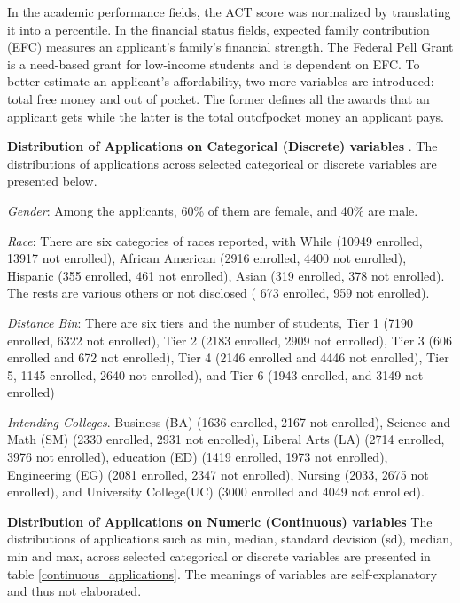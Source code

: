 \documentclass[12pt,english]{report}
\begin{document}
In the academic performance fields, the ACT score was normalized by translating it into a percentile.
In the financial status fields, expected family contribution (EFC) measures an applicant's family's financial strength. The Federal Pell Grant is a need-based grant for low-income students and is dependent on EFC. To better estimate an applicant's affordability, two more variables are introduced: total free money and out of pocket. The former defines all the awards that an applicant gets while the latter is the total out\-of\-pocket money an applicant pays.


\vspace{0.15in}
\noindent \textbf{Distribution of Applications on Categorical (Discrete) variables }.  The distributions of applications across selected categorical or discrete variables are presented below. 

\noindent \textit{Gender}: Among the applicants, 60\% of them are female, and 40\% are male.  

\noindent \textit{Race}:  There are six categories of races reported, with While (10949 enrolled, 13917 not enrolled), African American (2916 enrolled, 4400 not enrolled), Hispanic (355 enrolled, 461 not enrolled), Asian (319 enrolled, 378 not enrolled).  The rests are various others or not disclosed ( 673 enrolled, 959 not enrolled).

\noindent \textit{Distance Bin}: There are six tiers and the number of students, Tier 1 (7190 enrolled, 6322 not enrolled), Tier 2 (2183 enrolled, 2909 not enrolled), Tier 3 (606 enrolled and 672 not enrolled), Tier 4 (2146 enrolled and 4446 not enrolled), Tier 5, 1145 enrolled, 2640 not enrolled), and Tier 6 (1943 enrolled, and 3149 not enrolled) 

\noindent \textit{Intending Colleges}.  Business (BA) (1636 enrolled, 2167 not enrolled), Science and Math (SM) (2330 enrolled, 2931 not enrolled), Liberal Arts (LA) (2714 enrolled, 3976 not enrolled), education (ED) (1419 enrolled, 1973 not enrolled), Engineering (EG) (2081 enrolled, 2347 not enrolled), Nursing (2033, 2675 not enrolled), and University College(UC) (3000 enrolled and 4049 not enrolled). 


\vspace{0.15in}
\noindent \textbf{Distribution of Applications on Numeric (Continuous) variables }  The distributions of applications such as min, median, standard devision (sd), median, min and max, across selected categorical or discrete variables are presented in table \ref{continuous_applications}.  The meanings of variables are self-explanatory and thus not elaborated.
\end{document}
